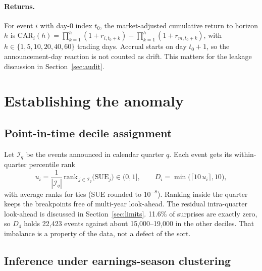 \documentclass[11pt]{article}
\theoremstyle{definition}
\newcommand{\1}{\mathbf{1}}
\begin{document}
\paragraph{Returns.} For event $i$ with day-0 index $t_0$, the market-adjusted cumulative
return to horizon $h$ is
$\mathrm{CAR}_i(h)=\prod_{k=1}^{h}(1+r_{i,t_0+k})-\prod_{k=1}^{h}(1+r_{m,t_0+k})$, with
$h\in\{1,5,10,20,40,60\}$ trading days. Accrual starts on day $t_0+1$, so the
announcement-day reaction is not counted as drift. This matters for the leakage discussion
in Section~\ref{sec:audit}.

\section{Establishing the anomaly}\label{sec:evidence}

\subsection{Point-in-time decile assignment}

Let $\mathcal{I}_q$ be the events announced in calendar quarter $q$. Each event gets its
within-quarter percentile rank
\begin{equation}
  u_i = \frac{1}{|\mathcal{I}_q|}\,\mathrm{rank}_{\,j\in\mathcal{I}_q}\!\big(\mathrm{SUE}_j\big)\in(0,1],
  \qquad D_i=\min\big(\lceil 10\,u_i\rceil,10\big),
\end{equation}
with average ranks for ties (SUE rounded to $10^{-8}$). Ranking inside the quarter keeps
the breakpoints free of multi-year look-ahead. The residual intra-quarter look-ahead is
discussed in Section~\ref{sec:limits}. 11.6\% of surprises are exactly zero, so $D_4$ holds
22{,}423 events against about 15{,}000--19{,}000 in the other deciles. That imbalance is a
property of the data, not a defect of the sort.

\subsection{Inference under earnings-season clustering}
\end{document}
